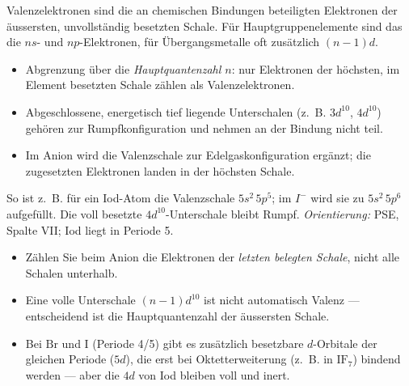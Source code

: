 
Valenzelektronen sind die an chemischen Bindungen beteiligten Elektronen der
äussersten, unvollständig besetzten Schale. Für Hauptgruppenelemente sind das
die $ns$- und $np$-Elektronen, für Übergangsmetalle oft zusätzlich $(n-1)d$.

\begin{werkzeugkasten}
\begin{itemize}
  \item Abgrenzung über die \textit{Hauptquantenzahl $n$}: nur Elektronen der
        höchsten, im Element besetzten Schale zählen als Valenzelektronen.
  \item Abgeschlossene, energetisch tief liegende Unterschalen (z.\ B.
        $3d^{10}$, $4d^{10}$) gehören zur Rumpfkonfiguration und nehmen an der
        Bindung nicht teil.
  \item Im Anion wird die Valenzschale zur Edelgaskonfiguration ergänzt; die
        zugesetzten Elektronen landen in der höchsten Schale.
\end{itemize}
So ist z.\ B. für ein Iod-Atom die Valenzschale $5s^2\,5p^5$; im $I^-$ wird sie
zu $5s^2\,5p^6$ aufgefüllt. Die voll besetzte $4d^{10}$-Unterschale bleibt
Rumpf.
\textit{Orientierung:} PSE, Spalte VII; Iod liegt in Periode 5.
\end{werkzeugkasten}

\begin{achtung}
\begin{itemize}
  \item Zählen Sie beim Anion die Elektronen der \textit{letzten belegten
        Schale}, nicht alle Schalen unterhalb.
  \item Eine volle Unterschale $(n-1)d^{10}$ ist nicht automatisch Valenz ---
        entscheidend ist die Hauptquantenzahl der äussersten Schale.
  \item Bei $\mathrm{Br}$ und $\mathrm{I}$ (Periode 4/5) gibt es zusätzlich
        besetzbare $d$-Orbitale der gleichen Periode ($5d$), die erst bei
        Oktetterweiterung (z.\ B. in $\mathrm{IF_7}$) bindend werden --- aber die
        $4d$ von Iod bleiben voll und inert.
\end{itemize}
\end{achtung}
